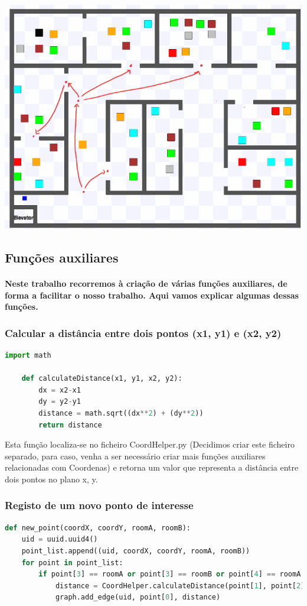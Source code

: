 \documentclass{article}
\begin{document}
\includegraphics[scale=0.4]{rosexample.png}

\newpage
\subsection{Funções auxiliares}  
  
\paragraph{Neste trabalho recorremos à criação de várias funções auxiliares, de forma a facilitar o nosso trabalho. Aqui vamos explicar algumas dessas funções.}

\subsubsection{Calcular a distância entre dois pontos (x1, y1) e (x2, y2)}
\begin{lstlisting}[language=Python]
    import math

    def calculateDistance(x1, y1, x2, y2):
        dx = x2-x1
        dy = y2-y1
        distance = math.sqrt((dx**2) + (dy**2))
        return distance
\end{lstlisting}

Esta função localiza-se no ficheiro CoordHelper.py (Decidimos criar este ficheiro separado, para caso, venha a ser necessário criar mais funções auxiliares relacionadas com Coordenas) e retorna um valor que representa a distância entre dois pontos no plano x, y.

\subsubsection{Registo de um novo ponto de interesse}
\begin{lstlisting}[language=Python]
  def new_point(coordX, coordY, roomA, roomB):
	uid = uuid.uuid4()
	point_list.append((uid, coordX, coordY, roomA, roomB))
	for point in point_list:
		if point[3] == roomA or point[3] == roomB or point[4] == roomA or point[4] == roomB:
			distance = CoordHelper.calculateDistance(point[1], point[2], coordX, coordY)
			graph.add_edge(uid, point[0], distance)
\end{lstlisting}
\end{document}
